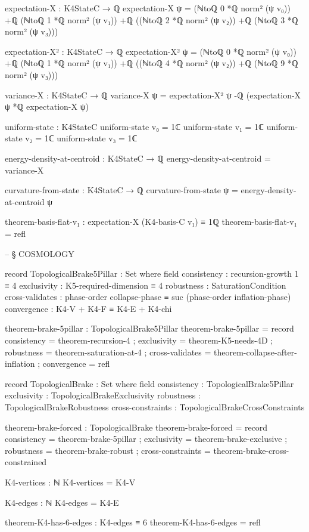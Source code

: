 \documentclass[11pt,a4paper]{book}
\begin{document}
\begin{code}
expectation-X : K4StateC → ℚ
expectation-X ψ = (ℕtoℚ 0 *ℚ norm² (ψ v₀)) +ℚ (ℕtoℚ 1 *ℚ norm² (ψ v₁))
              +ℚ ((ℕtoℚ 2 *ℚ norm² (ψ v₂)) +ℚ (ℕtoℚ 3 *ℚ norm² (ψ v₃)))

expectation-X² : K4StateC → ℚ
expectation-X² ψ = (ℕtoℚ 0 *ℚ norm² (ψ v₀)) +ℚ (ℕtoℚ 1 *ℚ norm² (ψ v₁))
               +ℚ ((ℕtoℚ 4 *ℚ norm² (ψ v₂)) +ℚ (ℕtoℚ 9 *ℚ norm² (ψ v₃)))

variance-X : K4StateC → ℚ
variance-X ψ = expectation-X² ψ -ℚ (expectation-X ψ *ℚ expectation-X ψ)

uniform-state : K4StateC
uniform-state v₀ = 1ℂ
uniform-state v₁ = 1ℂ
uniform-state v₂ = 1ℂ
uniform-state v₃ = 1ℂ

energy-density-at-centroid : K4StateC → ℚ
energy-density-at-centroid = variance-X

curvature-from-state : K4StateC → ℚ
curvature-from-state ψ = energy-density-at-centroid ψ


theorem-basis-flat-v₁ : expectation-X (K4-basis-C v₁) ≡ 1ℚ
theorem-basis-flat-v₁ = refl


-- § COSMOLOGY

record TopologicalBrake5Pillar : Set where
  field
    consistency     : recursion-growth 1 ≡ 4
    exclusivity     : K5-required-dimension ≡ 4
    robustness      : SaturationCondition
    cross-validates : phase-order collapse-phase ≡ suc (phase-order inflation-phase)
    convergence     : K4-V + K4-F ≡ K4-E + K4-chi

theorem-brake-5pillar : TopologicalBrake5Pillar
theorem-brake-5pillar = record
  { consistency     = theorem-recursion-4
  ; exclusivity     = theorem-K5-needs-4D
  ; robustness      = theorem-saturation-at-4
  ; cross-validates = theorem-collapse-after-inflation
  ; convergence     = refl
  }

record TopologicalBrake : Set where
  field
    consistency      : TopologicalBrake5Pillar
    exclusivity      : TopologicalBrakeExclusivity
    robustness       : TopologicalBrakeRobustness
    cross-constraints : TopologicalBrakeCrossConstraints

theorem-brake-forced : TopologicalBrake
theorem-brake-forced = record
  { consistency = theorem-brake-5pillar
  ; exclusivity = theorem-brake-exclusive
  ; robustness = theorem-brake-robust
  ; cross-constraints = theorem-brake-cross-constrained
  }

    
K4-vertices : ℕ
K4-vertices = K4-V

K4-edges : ℕ
K4-edges = K4-E

theorem-K4-has-6-edges : K4-edges ≡ 6
theorem-K4-has-6-edges = refl


\end{code}
\end{document}
